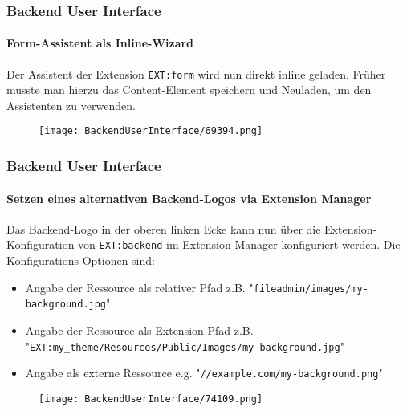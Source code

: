 \begin{frame}[fragile]
	\frametitle{Backend User Interface}
	\framesubtitle{Form-Assistent als Inline-Wizard}

	Der Assistent der Extension \texttt{EXT:form} wird nun direkt inline geladen.
	Früher musste man hierzu das Content-Element speichern und Neuladen, um den Assistenten zu verwenden.

	\begin{figure}
		\texttt{[image: BackendUserInterface/69394.png]}
	\end{figure}

\end{frame}

\begin{frame}[fragile]
	\frametitle{Backend User Interface}
	\framesubtitle{Setzen eines alternativen Backend-Logos via Extension Manager}

	Das Backend-Logo in der oberen linken Ecke kann nun über die Extension-Konfiguration von \texttt{EXT:backend} im Extension Manager konfiguriert werden.\newline
	Die Konfigurations-Optionen sind:

	\begin{itemize}
		\item Angabe der Ressource als relativer Pfad\newline
			\smaller
				z.B. "\texttt{fileadmin/images/my-background.jpg}"
			\normalsize

		\item Angabe der Ressource als Extension-Pfad\newline
			\smaller
				z.B. "\texttt{EXT:my\_theme/Resources/Public/Images/my-background.jpg}"
			\normalsize

		\item Angabe als externe Ressource\newline
			\smaller
				e.g. "\texttt{//example.com/my-background.png}"
			\normalsize

	\end{itemize}

	\begin{figure}
		\texttt{[image: BackendUserInterface/74109.png]}
	\end{figure}

\end{frame}

